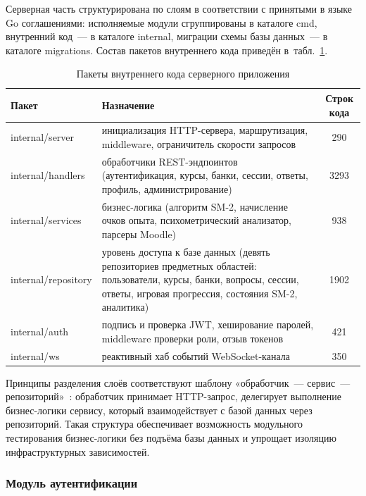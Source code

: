 Серверная часть структурирована по слоям в соответствии
с принятыми в языке Go соглашениями: исполняемые модули
сгруппированы в каталоге cmd, внутренний код~--- в каталоге
internal, миграции схемы базы данных~--- в каталоге
migrations. Состав пакетов внутреннего кода приведён
в~табл.~\ref{tab:backend-packages}.

\begin{table}[!htb]
\fontsize{11pt}{13pt}\selectfont
\centering
\caption{Пакеты внутреннего кода серверного приложения}
\label{tab:backend-packages}
\smallskip
\begin{tabular}{|l|p{8.5cm}|c|}
    \hline
    \textbf{Пакет} & \textbf{Назначение} & \textbf{Строк кода} \\
    \hline
        internal/server     & инициализация HTTP-сервера, маршрутизация, middleware, ограничитель скорости запросов & 290 \\
    \hline
        internal/handlers   & обработчики REST-эндпоинтов (аутентификация, курсы, банки, сессии, ответы, профиль, администрирование) & 3293 \\
    \hline
        internal/services   & бизнес-логика (алгоритм SM-2, начисление очков опыта, психометрический анализатор, парсеры Moodle) & 938 \\
    \hline
        internal/repository & уровень доступа к базе данных (девять репозиториев предметных областей: пользователи, курсы, банки, вопросы, сессии, ответы, игровая прогрессия, состояния SM-2, аналитика) & 1902 \\
    \hline
        internal/auth       & подпись и проверка JWT, хеширование паролей, middleware проверки роли, отзыв токенов & 421 \\
    \hline
        internal/ws         & реактивный хаб событий WebSocket-канала & 350 \\
    \hline
\end{tabular}
\end{table}
\FloatBarrier

Принципы разделения слоёв соответствуют шаблону «обработчик~---
сервис~--- репозиторий»~\cite{fowler_poeaa}: обработчик принимает
HTTP-запрос, делегирует выполнение бизнес-логики сервису, который
взаимодействует с базой данных через репозиторий. Такая структура
обеспечивает возможность модульного тестирования бизнес-логики
без подъёма базы данных и упрощает изоляцию инфраструктурных
зависимостей.

\subsubsection{Модуль аутентификации}

